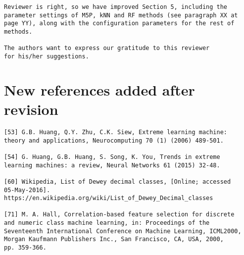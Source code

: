 \documentclass[preprint]{elsarticle}
\begin{document}
\begin{verbatim}
Reviewer is right, so we have improved Section 5, including the 
parameter settings of M5P, kNN and RF methods (see paragraph XX at 
page YY), along with the configuration parameters for the rest of 
methods.

The authors want to express our gratitude to this reviewer 
for his/her suggestions.
\end{verbatim}



\section{New references added after revision}

\begin{verbatim}
[53] G.B. Huang, Q.Y. Zhu, C.K. Siew, Extreme learning machine: 
theory and applications, Neurocomputing 70 (1) (2006) 489-501.

[54] G. Huang, G.B. Huang, S. Song, K. You, Trends in extreme 
learning machines: a review, Neural Networks 61 (2015) 32-48.

[60] Wikipedia, List of Dewey decimal classes, [Online; accessed 
05-May-2016]. https://en.wikipedia.org/wiki/List_of_Dewey_Decimal_classes

[71] M. A. Hall, Correlation-based feature selection for discrete 
and numeric class machine learning, in: Proceedings of the 
Seventeenth International Conference on Machine Learning, ICML2000, 
Morgan Kaufmann Publishers Inc., San Francisco, CA, USA, 2000, 
pp. 359-366.
\end{verbatim}
\end{document}
